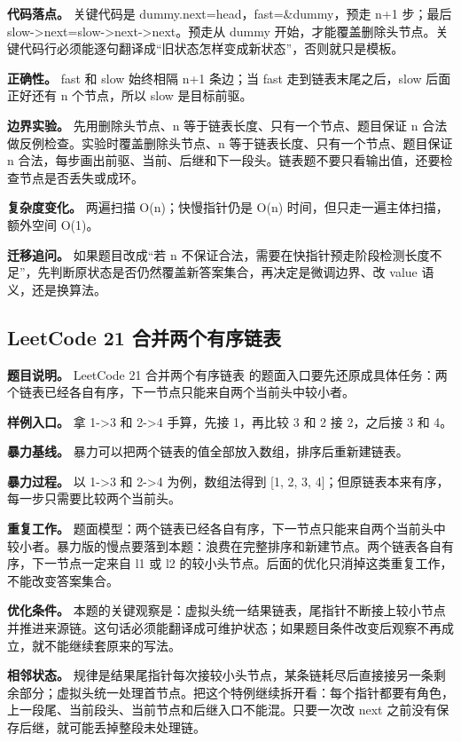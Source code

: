 \textbf{代码落点。} 关键代码是 dummy.next=head，fast=\&dummy，预走 n+1 步；最后 slow->next=slow->next->next。预走从 dummy 开始，才能覆盖删除头节点。关键代码行必须能逐句翻译成“旧状态怎样变成新状态”，否则就只是模板。

\textbf{正确性。} fast 和 slow 始终相隔 n+1 条边；当 fast 走到链表末尾之后，slow 后面正好还有 n 个节点，所以 slow 是目标前驱。

\textbf{边界实验。} 先用删除头节点、n 等于链表长度、只有一个节点、题目保证 n 合法做反例检查。实验时覆盖删除头节点、n 等于链表长度、只有一个节点、题目保证 n 合法，每步画出前驱、当前、后继和下一段头。链表题不要只看输出值，还要检查节点是否丢失或成环。

\textbf{复杂度变化。} 两遍扫描 O(n)；快慢指针仍是 O(n) 时间，但只走一遍主体扫描，额外空间 O(1)。

\textbf{迁移追问。} 如果题目改成“若 n 不保证合法，需要在快指针预走阶段检测长度不足”，先判断原状态是否仍然覆盖新答案集合，再决定是微调边界、改 value 语义，还是换算法。

\subsection{LeetCode 21 合并两个有序链表}

\textbf{题目说明。} LeetCode 21 合并两个有序链表 的题面入口要先还原成具体任务：两个链表已经各自有序，下一节点只能来自两个当前头中较小者。

\textbf{样例入口。} 拿 1->3 和 2->4 手算，先接 1，再比较 3 和 2 接 2，之后接 3 和 4。

\textbf{暴力基线。} 暴力可以把两个链表的值全部放入数组，排序后重新建链表。

\textbf{暴力过程。} 以 1->3 和 2->4 为例，数组法得到 [1, 2, 3, 4]；但原链表本来有序，每一步只需要比较两个当前头。

\textbf{重复工作。} 题面模型：两个链表已经各自有序，下一节点只能来自两个当前头中较小者。暴力版的慢点要落到本题：浪费在完整排序和新建节点。两个链表各自有序，下一节点一定来自 l1 或 l2 的较小头节点。后面的优化只消掉这类重复工作，不能改变答案集合。

\textbf{优化条件。} 本题的关键观察是：虚拟头统一结果链表，尾指针不断接上较小节点并推进来源链。这句话必须能翻译成可维护状态；如果题目条件改变后观察不再成立，就不能继续套原来的写法。

\textbf{相邻状态。} 规律是结果尾指针每次接较小头节点，某条链耗尽后直接接另一条剩余部分；虚拟头统一处理首节点。把这个特例继续拆开看：每个指针都要有角色，上一段尾、当前段头、当前节点和后继入口不能混。只要一次改 next 之前没有保存后继，就可能丢掉整段未处理链。

